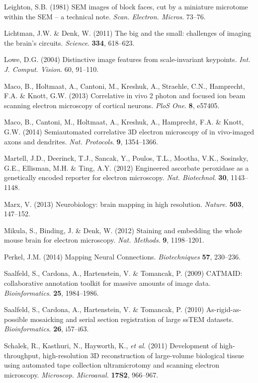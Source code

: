 \documentclass{article}
\begin{document}
\begin{hangpars}
Leighton, S.B. (1981) SEM images of block faces, cut by a miniature microtome within the SEM – a technical note. \emph{Scan. Electron. Micros}. 73–76.

Lichtman, J.W. \& Denk, W. (2011) The big and the small: challenges of imaging the brain’s circuits. \emph{Science}. \textbf{334}, 618–623.

Lowe, D.G. (2004) Distinctive image features from scale-invariant keypoints. \emph{Int. J. Comput. Vision}. 60, 91–110.

Maco, B., Holtmaat, A., Cantoni, M., Kreshuk, A., Straehle, C.N., Hamprecht, F.A. \& Knott, G.W. (2013) Correlative in vivo 2 photon and focused ion beam scanning electron microscopy of cortical neurons. \emph{PloS One}. \textbf{8}, e57405.

Maco, B., Cantoni, M., Holtmaat, A., Kreshuk, A., Hamprecht, F.A. \& Knott, G.W. (2014) Semiautomated correlative 3D electron microscopy of in vivo-imaged axons and dendrites. \emph{Nat. Protocols}. \textbf{9}, 1354–1366.

Martell, J.D., Deerinck, T.J., Sancak, Y., Poulos, T.L., Mootha, V.K., Sosinsky, G.E., Ellisman, M.H. \& Ting, A.Y. (2012) Engineered ascorbate peroxidase as a genetically encoded reporter for electron microscopy. \emph{Nat. Biotechnol}. \textbf{30}, 1143–1148.

Marx, V. (2013) Neurobiology: brain mapping in high resolution. \emph{Nature}. \textbf{503}, 147–152.

Mikula, S., Binding, J. \& Denk, W. (2012) Staining and embedding the whole mouse brain for electron microscopy. \emph{Nat. Methods}. \textbf{9}, 1198–1201.

Perkel, J.M. (2014) Mapping Neural Connections. \emph{Biotechniques} \textbf{57}, 230–236.

Saalfeld, S., Cardona, A., Hartenstein, V. \& Tomancak, P. (2009) CATMAID: collaborative annotation toolkit for massive amounts of image data. \emph{Bioinformatics}. \textbf{25}, 1984–1986.

Saalfeld, S., Cardona, A., Hartenstein, V. \& Tomancak, P. (2010) As-rigid-as-possible mosaicking and serial section registration of large ssTEM datasets. \emph{Bioinformatics}. \textbf{26}, i57–i63.

Schalek, R., Kasthuri, N., Hayworth, K., \emph{et al.} (2011) Development of high-throughput, high-resolution 3D reconstruction of large-volume biological tissue using automated tape collection ultramicrotomy and scanning electron microscopy. \emph{Microscop. Microanal.} \textbf{17S2}, 966–967.


\end{hangpars}
\end{document}
